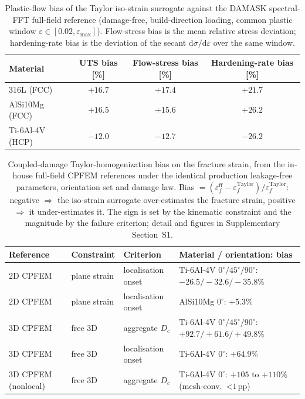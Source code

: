 \documentclass[11pt,a4paper,twocolumn]{article}
\begin{document}
\begin{table}[htbp]
\centering
\caption{Plastic-flow bias of the Taylor iso-strain surrogate against the DAMASK spectral-FFT full-field reference (damage-free, build-direction loading, common plastic window $\varepsilon\in[0.02,\varepsilon_{\max}]$). Flow-stress bias is the mean relative stress deviation; hardening-rate bias is the deviation of the secant $\mathrm{d}\sigma/\mathrm{d}\varepsilon$ over the same window.}
\label{tab:plastic_flow_bias}
\footnotesize
\setlength{\tabcolsep}{4pt}
\begin{tabular}{lccc}
\toprule
\textbf{Material} & \textbf{UTS bias [\%]} & \textbf{Flow-stress bias [\%]} & \textbf{Hardening-rate bias [\%]} \\
\midrule
316L (FCC)      & $+16.7$ & $+17.4$ & $+21.7$ \\
AlSi10Mg (FCC)  & $+16.5$ & $+15.6$ & $+26.2$ \\
Ti-6Al-4V (HCP) & $-12.0$ & $-12.7$ & $-26.2$ \\
\bottomrule
\end{tabular}
\end{table}



\begin{table}[htbp]
\centering
\caption{Coupled-damage Taylor-homogenization bias on the fracture strain, from the in-house full-field CPFEM references under the identical production leakage-free parameters, orientation set and damage law. Bias $=(\varepsilon_f^{\mathrm{ff}}-\varepsilon_f^{\mathrm{Taylor}})/\varepsilon_f^{\mathrm{Taylor}}$: negative $\Rightarrow$ the iso-strain surrogate over-estimates the fracture strain, positive $\Rightarrow$ it under-estimates it. The sign is set by the kinematic constraint and the magnitude by the failure criterion; detail and figures in Supplementary Section~S1.}
\label{tab:taylor_bias_conditions}
\footnotesize
\setlength{\tabcolsep}{4pt}
\begin{tabular}{@{}lllp{5.0cm}@{}}
\toprule
\textbf{Reference} & \textbf{Constraint} & \textbf{Criterion} & \textbf{Material / orientation: bias} \\
\midrule
2D CPFEM & plane strain & localisation onset & Ti-6Al-4V $0^\circ/45^\circ/90^\circ$: $-26.5/-32.6/-35.8\%$ \\
2D CPFEM & plane strain & localisation onset & AlSi10Mg $0^\circ$: $+5.3\%$ \\
3D CPFEM & free 3D & aggregate $D_c$ & Ti-6Al-4V $0^\circ/45^\circ/90^\circ$: $+92.7/+61.6/+49.8\%$ \\
3D CPFEM & free 3D & localisation onset & Ti-6Al-4V $0^\circ$: $+64.9\%$ \\
3D CPFEM (nonlocal) & free 3D & aggregate $D_c$ & Ti-6Al-4V $0^\circ$: $+105$ to $+110\%$ (mesh-conv.~<$1$\,pp) \\
\bottomrule
\end{tabular}
\end{table}
\end{document}

